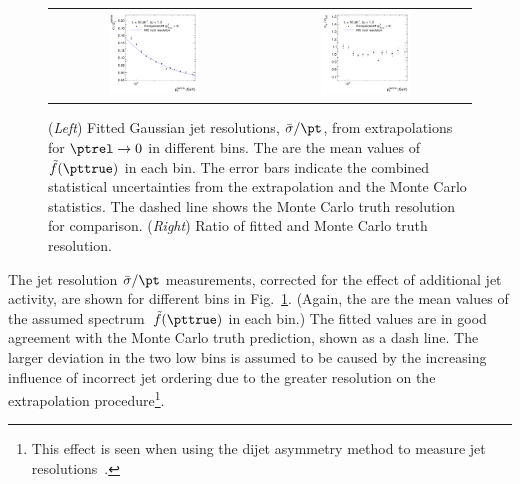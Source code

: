 \begin{figure}[ht]
  \centering
  \begin{tabular}{cc}
    \includegraphics[width=0.45\textwidth]{figures/ResFit_Spring10QCDFlat_Gauss_Eta0_ExtrapolatedResolution} &
    \includegraphics[width=0.45\textwidth]{figures/ResFit_Spring10QCDFlat_Gauss_Eta0_ExtrapolatedResolutionRatio}
  \end{tabular}
\caption{(\textit{Left}) Fitted Gaussian jet \pt resolutions, $\bar{\sigma}/\pt$, from extrapolations for \mbox{$\ptrel\rightarrow0$} in different \pt bins.
  The \pt are the mean values of $\tilde{f}(\pttrue)$ in each bin.
  The error bars indicate the combined statistical uncertainties from the extrapolation and the Monte Carlo statistics.
  The dashed line shows the Monte Carlo truth resolution for comparison.
  (\textit{Right}) Ratio of fitted and Monte Carlo truth resolution.}
\label{fig:ResFit:QCDMC:Extrapolation:Gauss:ResoVsPt}
\end{figure}

The jet \pt resolution $\bar{\sigma}/\pt$ measurements, corrected for the effect of additional jet activity, are shown for different \pt bins in Fig.~\ref{fig:ResFit:QCDMC:Extrapolation:Gauss:ResoVsPt}.
(Again, the \pt are the mean values of the assumed spectrum~$\tilde{f}(\pttrue)$ in each bin.)
The fitted values are in good agreement with the Monte Carlo truth prediction, shown as a dash line.
The larger deviation in the two low \pt bins is assumed to be caused by the increasing influence of incorrect jet ordering due to the greater resolution on the extrapolation procedure\footnote{This effect is seen when using the dijet asymmetry method to measure jet \pt resolutions~\cite{bib:cmspas:dijetasymm}.}.

